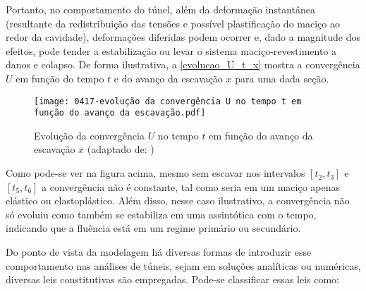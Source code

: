 Portanto, no comportamento do túnel, além da deformação instantânea (resultante da redistribuição das tensões e possível plastificação do maciço ao redor da cavidade), deformações diferidas podem ocorrer e, dado a magnitude dos efeitos, pode tender a estabilização ou levar o sistema maciço-revestimento a danos e colapso. De forma ilustrativa, a \autoref{evolucao_U_t_x} mostra a convergência $U$ em função do tempo $t$ e do avanço da escavação $x$ para uma dada seção.

\begin{figure}[H]
	\begin{center}
		\texttt{[image: 0417-evolução da convergência U no tempo t em função do avanço da escavação.pdf]}
	\end{center}
	\caption{\label{evolucao_U_t_x}Evolução da convergência $U$ no tempo $t$ em função do avanço da escavação $x$ (adaptado de: )}
\end{figure}

Como pode-se ver na figura acima, mesmo sem escavar nos intervalos $[t_2,t_3]$ e $[t_5,t_6]$ a convergência não é constante, tal como seria em um maciço apenas elástico ou elastoplástico. Além disso, nesse caso ilustrativo, a convergência não só evoluiu como também se estabiliza em uma assintótica com o tempo, indicando que a fluência está em um regime primário ou secundário. 

Do ponto de vista da modelagem há diversas formas de introduzir esse comportamento nas análises de túneis, sejam em soluções analíticas ou numéricas, diversas leis constitutivas são empregadas. Pode-se classificar essas leis como: 

